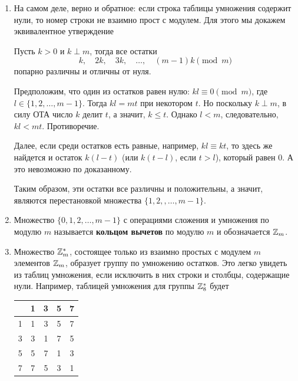 \begin{enumerate}
\item На самом деле, верно и обратное: если строка таблицы умножения содержит нули, то номер строки не взаимно прост с модулем. Для этого мы докажем эквивалентное утверждение
\begin{thrm}
Пусть $k>0$  и  $k\perp m$, тогда все остатки
$$
k,\quad 2k,\quad 3k,\quad\dots,\quad (m-1)k\pmod m
$$
попарно различны и отличны от нуля.
\end{thrm}
\pf Предположим, что один из остатков равен нулю: $kl\equiv 0\pmod m$, где $l\in\{1,2,\dots,m-1\}$. Тогда $kl=mt$ при некотором $t$. Но поскольку $k\perp m$, в силу ОТА число $k$ делит $t$, а значит, $k\le t$. Однако $l<m$, следовательно, $kl<mt$. Противоречие.

Далее, если среди остатков есть равные, например, $kl\equiv kt$, то здесь же найдется и остаток $k(l-t)$ (или $k(t-l)$, если $t>l$), который равен 0. А это невозможно по доказанному. 

Таким образом, эти остатки все различны и положительны, а значит, являются перестановкой множества $\{1,2,,\dots,m-1\}$.
\epf
\item Множество $\{0,1,2,\dots,m-1\}$ с операциями сложения и умножения по модулю $m$ называется \textbf{кольцом вычетов} по модулю $m$ и обозначается $\mathbb Z_m$.
\item Множество $\mathbb Z_m^*$, состоящее только из взаимно простых с модулем $m$ элементов $\mathbb Z_m$, образует группу по умножению остатков. Это легко увидеть из таблиц умножения, если исключить в них строки и столбцы, содержащие нули. Например, таблицей умножения для группы $\mathbb Z_8^*$ будет 
\begin{center}
\begin{tabular}{c||c|c|c|c|}
  & 1 & 3 & 5 & 7 \\ \hline\hline
1 & 1 & 3 & 5 & 7 \\ \hline
3 & 3 & 1 & 7 & 5 \\ \hline
5 & 5 & 7 & 1 & 3 \\ \hline
7 & 7 & 5 & 3 & 1 \\ \hline
\end{tabular}
\end{center}

\end{enumerate}



